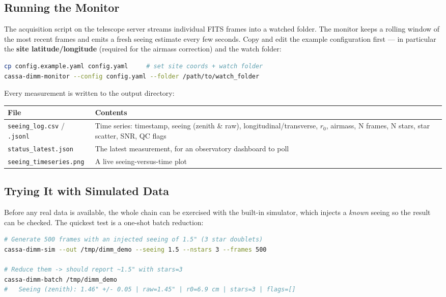 \documentclass[11pt,a4paper]{article}
\begin{document}
\subsection{Running the Monitor}
The acquisition script on the telescope server streams individual FITS frames into a watched folder. The monitor keeps a rolling window of the most recent frames and emits a fresh seeing estimate every few seconds. Copy and edit the example configuration first --- in particular the \textbf{site latitude/longitude} (required for the airmass correction) and the watch folder:
\begin{lstlisting}[language=bash]
cp config.example.yaml config.yaml     # set site coords + watch folder
cassa-dimm-monitor --config config.yaml --folder /path/to/watch_folder
\end{lstlisting}
Every measurement is written to the output directory:
\begin{center}
\begin{tabularx}{\textwidth}{|l|X|}
\hline
\textbf{File} & \textbf{Contents} \\
\hline
\texttt{seeing\_log.csv} / \texttt{.jsonl} & Time series: timestamp, seeing (zenith \& raw), longitudinal/transverse, $r_0$, airmass, N frames, N stars, star scatter, SNR, QC flags \\
\hline
\texttt{status\_latest.json} & The latest measurement, for an observatory dashboard to poll \\
\hline
\texttt{seeing\_timeseries.png} & A live seeing-versus-time plot \\
\hline
\end{tabularx}
\end{center}

\subsection{Trying It with Simulated Data}
Before any real data is available, the whole chain can be exercised with the
built-in simulator, which injects a \emph{known} seeing so the result can be
checked. The quickest test is a one-shot batch reduction:
\begin{lstlisting}[language=bash]
# Generate 500 frames with an injected seeing of 1.5" (3 star doublets)
cassa-dimm-sim --out /tmp/dimm_demo --seeing 1.5 --nstars 3 --frames 500

# Reduce them -> should report ~1.5" with stars=3
cassa-dimm-batch /tmp/dimm_demo
#   Seeing (zenith): 1.46" +/- 0.05 | raw=1.45" | r0=6.9 cm | stars=3 | flags=[]
\end{lstlisting}
\end{document}
